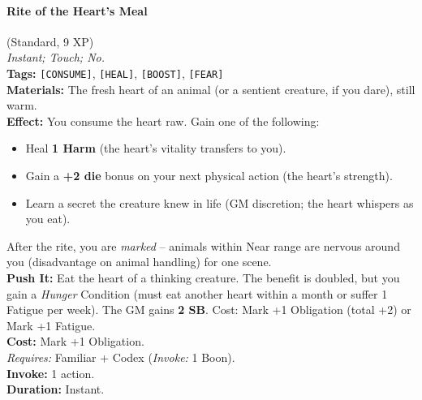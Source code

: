 \paragraph{Rite of the Heart's Meal} (Standard, 9 XP) \hfill \\
\emph{Instant; Touch; No.} \\
\textbf{Tags:} \texttt{[CONSUME]}, \texttt{[HEAL]}, \texttt{[BOOST]}, \texttt{[FEAR]} \\
\textbf{Materials:} The fresh heart of an animal (or a sentient creature, if you dare), still warm. \\
\textbf{Effect:} You consume the heart raw. Gain one of the following:
\begin{itemize}
  \item Heal \textbf{1 Harm} (the heart's vitality transfers to you).
  \item Gain a \textbf{+2 die} bonus on your next physical action (the heart's strength).
  \item Learn a secret the creature knew in life (GM discretion; the heart whispers as you eat).
\end{itemize}
After the rite, you are \textit{marked} -- animals within Near range are nervous around you (disadvantage on animal handling) for one scene. \\
\textbf{Push It:} Eat the heart of a thinking creature. The benefit is doubled, but you gain a \textit{Hunger} Condition (must eat another heart within a month or suffer 1 Fatigue per week). The GM gains \textbf{2 SB}. Cost: Mark +1 Obligation (total +2) or Mark +1 Fatigue. \\
\textbf{Cost:} Mark +1 Obligation. \\
\textit{Requires:} Familiar + Codex (\textit{Invoke:} 1 Boon). \\
\textbf{Invoke:} 1 action. \\
\textbf{Duration:} Instant.

